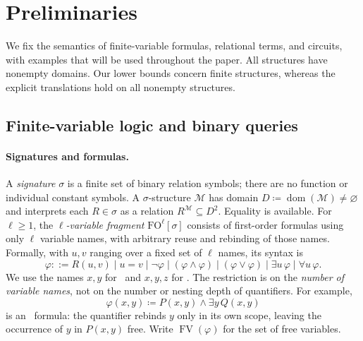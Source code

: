 
\section{Preliminaries}\label{sec:aggregation}
We fix the semantics of finite-variable formulas, relational terms, and
circuits, with examples that will be used throughout the paper. All
structures have nonempty domains. Our lower bounds concern finite
structures, whereas the explicit translations hold on all nonempty
structures.

\subsection{Finite-variable logic and binary queries}\label{sec:prelim-logic}
\paragraph{Signatures and formulas.}
A \emph{signature} $\sigma$ is a finite set of binary relation symbols;
there are no function or individual constant symbols. A $\sigma$-structure
$\mathcal M$ has domain $D\coloneqq\operatorname{dom}(\mathcal M)\ne\varnothing$
and interprets each $R\in\sigma$ as a relation $R^{\mathcal M}\subseteq D^2$.
Equality is available. For $\ell\ge1$, the \emph{$\ell$-variable fragment}
$\mathrm{FO}^{\ell}[\sigma]$ consists of first-order formulas using only
$\ell$ variable names, with arbitrary reuse and rebinding of those names.
Formally, with $u,v$ ranging over a fixed set of $\ell$ names, its syntax is
\[
 \varphi::=R(u,v)\mid u=v\mid\neg\varphi
 \mid(\varphi\land\varphi)\mid(\varphi\lor\varphi)
 \mid\exists u\,\varphi\mid\forall u\,\varphi.
\]
We use the names $x,y$ for \FOtwo\ and $x,y,z$ for \FOthree.
The restriction is on the \emph{number of variable names}, not on the
number or nesting depth of quantifiers. For example,
\[
 \varphi(x,y)\coloneqq P(x,y)\land\exists y\,Q(x,y)
\]
is an \FOtwo\ formula: the quantifier rebinds $y$ only in its own scope,
leaving the occurrence of $y$ in $P(x,y)$ free. Write
$\operatorname{FV}(\varphi)$ for the set of free variables.


